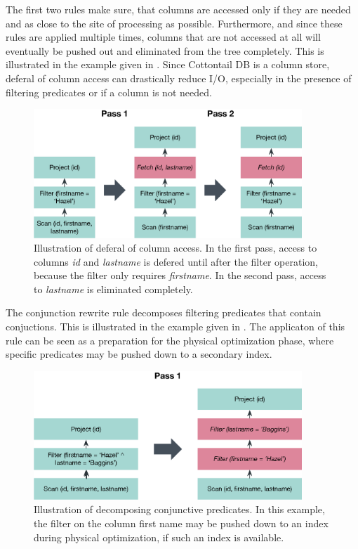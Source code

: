 The first two rules make sure, that columns are accessed only if they are needed and as close to the site of processing as possible. Furthermore, and since these rules are applied multiple times, columns that are not accessed at all will eventually be pushed out and eliminated from the tree completely. This is illustrated in the example given in . Since Cottontail DB is a column store, deferal of column access can drastically reduce I/O, especially in the presence of filtering predicates or if a column is not needed. 

\begin{figure}[bt]
    \centering
    \includegraphics[width=0.9\textwidth]{figures/logical-rule-fetch}
    \caption{Illustration of deferal of column access. In the first pass, access to columns \emph{id} and \emph{lastname} is defered until after the filter operation, because the filter only requires \emph{firstname}. In the second pass, access to \emph{lastname} is eliminated completely.}
    \label{figure:cottontail_logical_rule_fetch}
\end{figure}

The conjunction rewrite rule decomposes filtering predicates that contain conjuctions. This is illustrated in the example given in . The applicaton of this rule can be seen as a preparation for the physical optimization phase, where specific predicates may be pushed down to a secondary index.

\begin{figure}[bt]
    \centering
    \includegraphics[width=0.9\textwidth]{figures/logical-rule-conjunction}
    \caption{Illustration of decomposing conjunctive predicates. In this example, the filter on the column first name may be pushed down to an index during physical optimization, if such an index is available.}
    \label{figure:cottontail_logical_rule_conjunction}
\end{figure}


